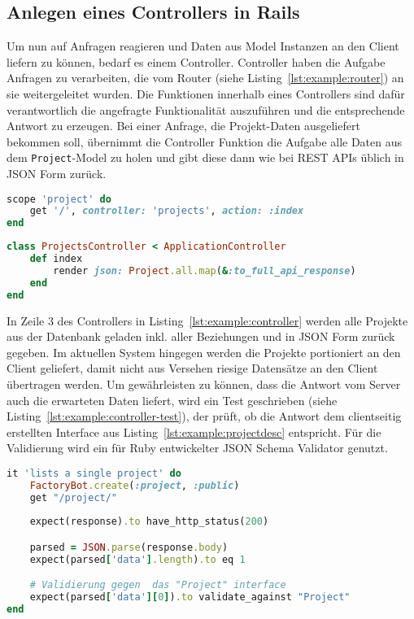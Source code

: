\subsection{Anlegen eines Controllers in Rails}
\label{sec:requirements:example:controller}
Um nun auf Anfragen reagieren und Daten aus Model Instanzen an den Client liefern zu können, bedarf es einem Controller.
Controller haben die Aufgabe Anfragen zu verarbeiten, die vom Router (siehe Listing~\ref{lst:example:router}) an sie weitergeleitet wurden.
Die Funktionen innerhalb eines Controllers sind dafür verantwortlich die angefragte Funktionalität auszuführen und die entsprechende Antwort zu erzeugen.
Bei einer Anfrage, die Projekt-Daten ausgeliefert bekommen soll, übernimmt die Controller Funktion die Aufgabe alle Daten aus dem \texttt{Project}-Model
zu holen und gibt diese dann wie bei REST APIs üblich in JSON Form zurück.

\begin{lstlisting}[language=Ruby,float=h!,caption={Route entspricht URL '/project/' und leitet Anfrage an die ProjectsController Funktion \texttt{index} weiter }, label={lst:example:router}]
scope 'project' do
	get '/', controller: 'projects', action: :index
end
\end{lstlisting}

\begin{lstlisting}[language=Ruby,float=h!,caption={Controller mit Funktion zum zurückgeben aller Project Instanzen}, label={lst:example:controller}]
class ProjectsController < ApplicationController
	def index
		render json: Project.all.map(&:to_full_api_response)
	end
end
\end{lstlisting}

In Zeile 3 des Controllers in Listing~\ref{lst:example:controller} werden alle Projekte aus der Datenbank geladen inkl. aller Beziehungen und in JSON Form zurück gegeben. Im aktuellen System hingegen werden die Projekte portioniert an den Client geliefert, damit nicht aus Versehen riesige Datensätze an den Client übertragen werden. Um gewährleisten zu können, dass die Antwort vom Server auch die erwarteten Daten liefert, wird ein
Test geschrieben (siehe Listing~\ref{lst:example:controller-test}), der prüft, ob die Antwort dem clientseitig erstellten Interface aus Listing~\ref{lst:example:projectdesc} entspricht.
Für die Validierung wird ein für Ruby entwickelter JSON Schema Validator genutzt.

\begin{lstlisting}[language=Ruby,float=h!,caption={Test überprüft, ob bei Anfrage der Route '/project/' eine Antwort vom Typ Project folgt}, label={lst:example:controller-test}]
it 'lists a single project' do
	FactoryBot.create(:project, :public)
	get "/project/"
	
	expect(response).to have_http_status(200)

	parsed = JSON.parse(response.body)
	expect(parsed['data'].length).to eq 1

	# Validierung gegen  das "Project" interface
	expect(parsed['data'][0]).to validate_against "Project"
end
\end{lstlisting}

